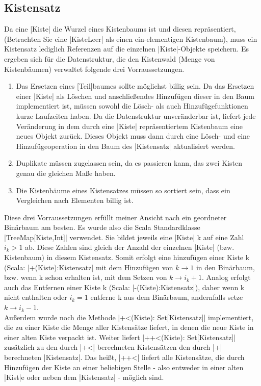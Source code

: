 \subsection{Kistensatz}
 Da eine |Kiste| die Wurzel eines Kistenbaums ist und diesen repräsentiert, (Betrachten Sie eine |KisteLeer| als einen ein-elementigen Kistenbaum),
  muss ein Kistensatz lediglich Referenzen auf die einzelnen |Kiste|-Objekte speichern.
 Es ergeben sich für die Datenstruktur, die den Kistenwald (Menge von Kistenbäumen) verwaltet folgende drei Vorraussetzungen. 
\begin{enumerate}
 \item Das Ersetzen eines [Teil]baumes sollte möglichst billig sein.
Da das Ersetzen einer |Kiste| als Löschen und anschließendes Hinzufügen dieser in den Baum implementiert ist,
  müssen sowohl die Lösch- als auch Hinzufügefunktionen kurze Laufzeiten haben.
Da die Datenstruktur unveränderbar ist, liefert jede Veränderung in dem durch eine |Kiste| repräsentiertem Kistenbaum eine neues Objekt zurück.
Dieses Objekt muss dann durch eine Lösch- und eine Hinzufügeoperation in den Baum des |Kistensatz| aktualisiert werden.
 \item Duplikate müssen zugelassen sein, da es passieren kann, das zwei Kisten genau die gleichen Maße haben.
 \item Die Kistenbäume eines Kistensatzes müssen so sortiert sein, dass ein Vergleichen nach Elementen billig ist.
\end{enumerate}
Diese drei Vorraussetzungen erfüllt meiner Ansicht nach ein geordneter Binärbaum am besten.
Es wurde also die Scala Standardklasse |TreeMap[Kiste,Int]| verwendet. Sie bildet jeweils eine |Kiste| k auf eine Zahl $i_k > 1$ ab.
Diese Zahlen sind gleich der Anzahl der einzelnen |Kiste| (bzw. Kistenbaum) in diesem Kistensatz.
Somit erfolgt eine hinzufügen einer Kiste k (Scala: |+(Kiste):Kistensatz| mit dem Hinzufügen von $k \rightarrow 1$ in den Binärbaum,
  bzw. wenn k schon erhalten ist, mit dem Setzen von $k \rightarrow i_k + 1$.
Analog erfolgt auch das Entfernen einer Kiste k (Scala: |-(Kiste):Kistensatz|),
  daher wenn k nicht enthalten oder $i_k = 1$ entferne k aus dem Binärbaum, andernfalls setze $k \rightarrow i_k - 1$.\\
Außerdem wurde noch die Methode |+<(Kiste): Set[Kistensatz]| implementiert, die zu einer Kiste die Menge aller Kistensätze liefert,
in denen die neue Kiste in einer alten Kiste verpackt ist.
Weiter liefert |++<(Kiste): Set[Kistensatz]| zusätzlich zu den durch |+<| berechneten Kistensätzen den durch |+| berechneten |Kistensatz|.
Das heißt, |++<| liefert alle Kistensätze, die durch Hinzufügen der Kiste an einer beliebigen Stelle
 - also entweder in einer alten |Kist|e oder neben dem |Kistensatz| - möglich sind.
